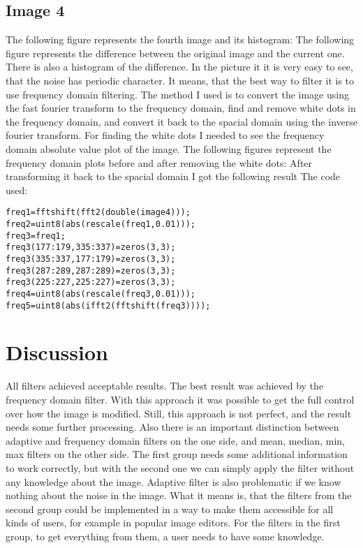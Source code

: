 \documentclass[a4paper]{article}
\begin{document}
\subsection{Image 4}
The following figure represents the fourth image and its histogram:
The following figure represents the difference between the original image
and the current one. There is also a histogram of the difference.
In the picture it it is very easy to see, that the noise has periodic character.
It means, that the best way to filter it is to use frequency domain filtering. The method I used is to convert the image using the fast fourier transform to the frequency domain, find and remove white dots in the frequency domain, and convert it back to the spacial domain using the inverse fourier transform. For finding the white dots I needed to see the frequency domain absolute value plot of the image. The following figures represent the frequency domain plots before and after removing the white dots:
After transforming it back to the spacial domain I got the following result
{\noindent}The code used:
\begin{lstlisting}
freq1=fftshift(fft2(double(image4)));
freq2=uint8(abs(rescale(freq1,0.01)));
freq3=freq1;
freq3(177:179,335:337)=zeros(3,3);
freq3(335:337,177:179)=zeros(3,3);
freq3(287:289,287:289)=zeros(3,3);
freq3(225:227,225:227)=zeros(3,3);
freq4=uint8(abs(rescale(freq3,0.01)));
freq5=uint8(abs(ifft2(fftshift(freq3))));
\end{lstlisting}
\section{Discussion}
All filters achieved acceptable results. The best result was achieved by the frequency domain filter. With this approach it was possible to get the full control over how the image is modified. Still, this approach is not perfect, and the result needs some further processing. Also there is an important distinction between adaptive and frequency domain filters on the one side, and mean, median, min, max filters on the other side. The first group needs some additional information to work correctly, but with the second one we can simply apply the filter without any knowledge about the image. Adaptive filter is also problematic if we know nothing about the noise in the image. What it means is, that the filters from the second group could be implemented in a way to make them accessible for all kinds of users, for example in popular image editors. For the filters in the first group, to get everything from them, a user needs to have some knowledge.
\end{document}
